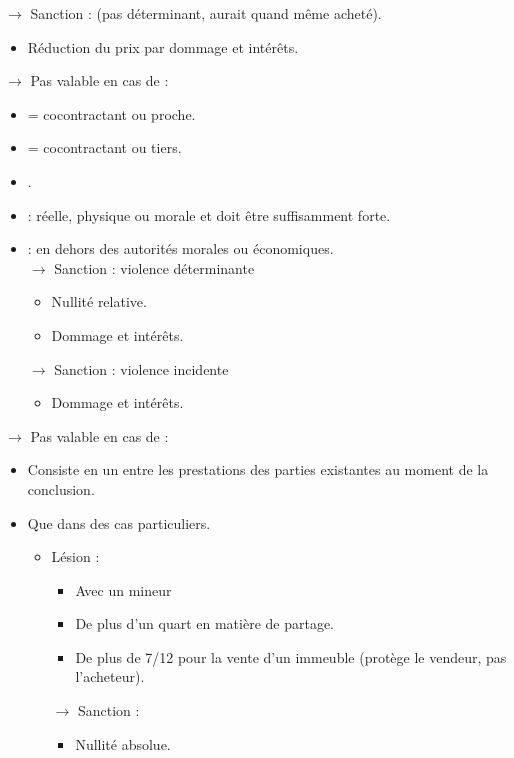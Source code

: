\begin{itemize}
\begin{itemize}
		$\rightarrow$ Sanction :  (pas déterminant, aurait quand même acheté).
		\begin{itemize}
			\item Réduction du prix par dommage et intérêts.
		\end{itemize}
	\end{itemize}
	$\rightarrow$ Pas valable en cas de  :
	\begin{itemize}
		\item {} = cocontractant ou proche.
		\item {} = cocontractant ou tiers.
		\item {}.
		\item {} : réelle, physique ou morale et doit être suffisamment forte.
		\item {} : en dehors des autorités morales ou économiques.\\
		$\rightarrow$ Sanction : violence déterminante
		\begin{itemize}
			\item Nullité relative.
			\item Dommage et intérêts.
		\end{itemize}
		$\rightarrow$ Sanction : violence incidente
		\begin{itemize}
			\item Dommage et intérêts.
		\end{itemize}
	\end{itemize}
	$\rightarrow$ Pas valable en cas de  :
	\begin{itemize}
		\item Consiste en un  entre les prestations des parties existantes au moment de la conclusion.
		\item Que dans des cas particuliers.
		\begin{itemize}
			\item Lésion  :
			\begin{itemize}
				\item Avec un mineur
				\item De plus d'un quart en matière de partage.
				\item De plus de 7/12 pour la vente d'un immeuble (protège le vendeur, pas l'acheteur).
			\end{itemize}
			$\rightarrow$ Sanction :
			\begin{itemize}
				\item Nullité absolue.

\end{itemize}
\end{itemize}
\end{itemize}
\end{itemize}

